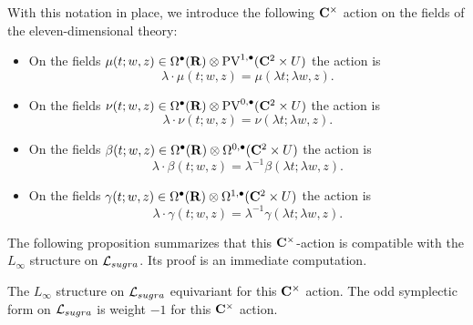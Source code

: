 With this notation in place, we introduce the following $\mathbf{C}^\times$ action on the fields of the eleven-dimensional theory:
\begin{itemize}
\item On the fields $\mu(t;w,z) \in \Omega^\bullet(\mathbf{R}) \otimes {\rm PV}^{1,\bullet}(\mathbf{C}^2 \times U)$ the action is
\[
\lambda \cdot \mu(t;w,z) = \mu(\lambda t;\lambda w , z).
\]
\item On the fields $\nu(t;w,z) \in \Omega^\bullet(\mathbf{R}) \otimes {\rm PV}^{0,\bullet}(\mathbf{C}^2 \times U)$ the action is
\[
\lambda \cdot \nu(t;w,z) = \nu(\lambda t;\lambda w , z).
\]
\item On the fields $\beta(t;w,z) \in \Omega^\bullet(\mathbf{R}) \otimes \Omega^{0,\bullet}(\mathbf{C}^2 \times U)$ the action is
\[
\lambda \cdot \beta(t;w,z) = \lambda^{-1} \beta(\lambda t;\lambda w , z).
\]
\item On the fields $\gamma(t;w,z) \in \Omega^\bullet(\mathbf{R}) \otimes \Omega^{1,\bullet}(\mathbf{C}^2 \times U)$ the action is
\[
\lambda \cdot \gamma(t;w,z) = \lambda^{-1} \gamma(\lambda t;\lambda w , z).
\]
\end{itemize}

The following proposition summarizes that this $\mathbf{C}^\times$-action is compatible with the $L_\infty$ structure on $\mathcal L_{sugra}$.
Its proof is an immediate computation. 

\begin{prop}
The $L_\infty$ structure on $\mathcal L_{sugra}$ equivariant for this $\mathbf{C}^\times$ action. 
The odd symplectic form on $\mathcal L_{sugra}$ is weight $-1$ for this $\mathbf{C}^\times$ action. 
\end{prop}

